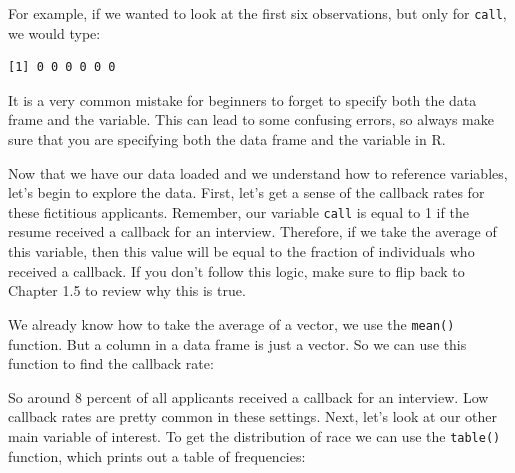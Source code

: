 \documentclass[
]{book}
\newenvironment{Shaded}{\begin{snugshade}}{\end{snugshade}}
\newcommand{\DecValTok}[1]{\textcolor[rgb]{0.00,0.00,0.81}{#1}}
\newcommand{\FloatTok}[1]{\textcolor[rgb]{0.00,0.00,0.81}{#1}}
\newcommand{\FunctionTok}[1]{\textcolor[rgb]{0.13,0.29,0.53}{\textbf{#1}}}
\newcommand{\NormalTok}[1]{#1}
\newcommand{\SpecialCharTok}[1]{\textcolor[rgb]{0.81,0.36,0.00}{\textbf{#1}}}
\begin{document}
For example, if we wanted to look at the first six observations, but only for \texttt{call}, we would type:

\begin{Shaded}
\end{Shaded}

\begin{verbatim}
[1] 0 0 0 0 0 0
\end{verbatim}

It is a very common mistake for beginners to forget to specify both the data frame and the variable. This can lead to some confusing errors, so always make sure that you are specifying both the data frame and the variable in R.

Now that we have our data loaded and we understand how to reference variables, let's begin to explore the data. First, let's get a sense of the callback rates for these fictitious applicants. Remember, our variable \texttt{call} is equal to 1 if the resume received a callback for an interview. Therefore, if we take the average of this variable, then this value will be equal to the fraction of individuals who received a callback. If you don't follow this logic, make sure to flip back to Chapter 1.5 to review why this is true.

We already know how to take the average of a vector, we use the \texttt{mean()} function. But a column in a data frame is just a vector. So we can use this function to find the callback rate:

\begin{Shaded}
\end{Shaded}

So around 8 percent of all applicants received a callback for an interview. Low callback rates are pretty common in these settings. Next, let's look at our other main variable of interest. To get the distribution of race we can use the \texttt{table()} function, which prints out a table of frequencies:

\begin{Shaded}
\end{Shaded}
\end{document}
